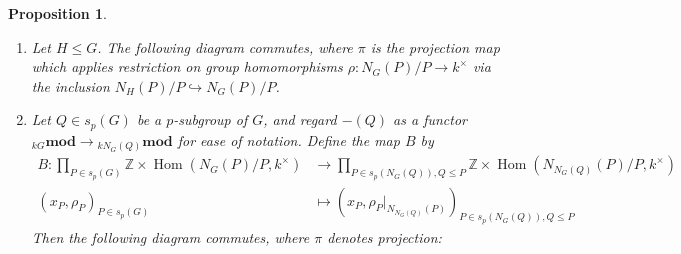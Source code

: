 \documentclass[10pt,letterpaper, boxed, cm]{amsart}
\newcommand{\Z}{\mathbb{Z}}
\newcommand{\Hom}{\operatorname{Hom}}
\newcommand{\calE}{\mathcal{E}}
\newtheorem{prop}[theorem]{Proposition}
\theoremstyle{remark}
\theoremstyle{definition}
\begin{document}
	\begin{prop}
		\begin{enumerate}
			\item Let $H \leq G$. The following diagram commutes, where $\pi$ is the projection map which applies restriction on group homomorphisms $\rho: N_G(P)/P \to k^\times$  via the inclusion $N_H(P)/P \hookrightarrow N_G(P)/P$.
			\begin{figure}[H]
				\centering
			\end{figure}

			\item Let $Q \in s_p(G)$ be a $p$-subgroup of $G$, and regard $-(Q)$ as a functor ${}_{kG}\mathbf{mod} \to {}_{kN_G(Q)}\mathbf{mod}$ for ease of notation. Define the map $B$ by
			\begin{align*}
			B: \prod_{P \in s_p(G)} \Z \times \Hom(N_G(P)/P, k^\times) &\to  \prod_{P \in  s_p(N_G(Q)), Q\leq P} \Z \times \Hom(N_{N_G(Q)}(P)/P, k^\times) \\
			(x_P, \rho_P)_{P \in s_p(G)} &\mapsto
			\left(x_P, \rho_P|_{N_{N_G(Q)}(P)}\right)_{P \in s_p(N_G(Q)), Q \leq P}
			\end{align*}
			Then the following diagram commutes, where $\pi$ denotes projection:
			\begin{figure}[H]
				\centering
			\end{figure}


\end{enumerate}
\end{prop}
\end{document}

